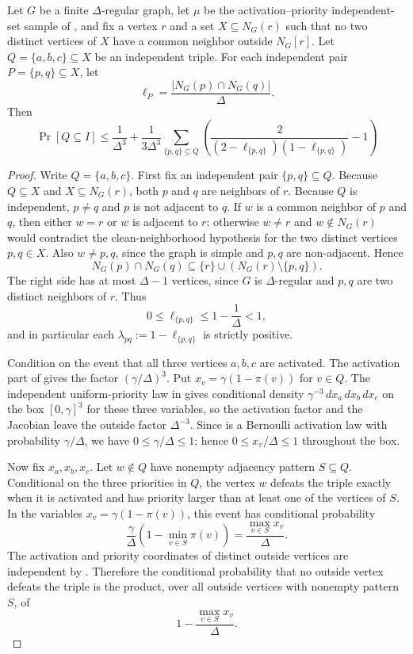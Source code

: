 \begin{helper}
Let $G$ be a finite $\Delta$-regular graph, let $\mu$ be the
activation--priority independent-set sample of
, and fix a vertex $r$ and a set
$X\subseteq N_G(r)$ such that no two distinct vertices of $X$ have a common
neighbor outside $N_G[r]$.  Let $Q=\{a,b,c\}\subseteq X$ be an independent
triple.  For each independent pair $P=\{p,q\}\subseteq X$, let
\[
\ell_P=\frac{|N_G(p)\cap N_G(q)|}{\Delta}.
\]
Then
\[
\Pr[Q\subseteq I]
\le
\frac1{\Delta^3}
+\frac{1}{3\Delta^3}\sum_{\{p,q\}\subseteq Q}
\left(\frac{2}{(2-\ell_{\{p,q\}})(1-\ell_{\{p,q\}})}-1\right)
\]
\end{helper}
\begin{proof}
Write $Q=\{a,b,c\}$.  First fix an independent pair $\{p,q\}\subseteq Q$.
Because $Q\subseteq X$ and $X\subseteq N_G(r)$, both $p$ and $q$ are
neighbors of $r$.  Because $Q$ is independent, $p\ne q$ and $p$ is not
adjacent to $q$.  If $w$ is a common neighbor of $p$ and $q$, then either
$w=r$ or $w$ is adjacent to $r$: otherwise $w\ne r$ and $w\notin N_G(r)$
would contradict the clean-neighborhood hypothesis for the two distinct
vertices $p,q\in X$.  Also $w\ne p,q$, since the graph is simple and
$p,q$ are non-adjacent.  Hence
\[
N_G(p)\cap N_G(q)\subseteq \{r\}\cup (N_G(r)\setminus\{p,q\}).
\]
The right side has at most $\Delta-1$ vertices, since $G$ is
$\Delta$-regular and $p,q$ are two distinct neighbors of $r$.  Thus
\[
0\le \ell_{\{p,q\}}\le 1-\frac1\Delta<1,
\]
and in particular each
$\lambda_{pq}:=1-\ell_{\{p,q\}}$ is strictly positive.

Condition on the event that all three vertices $a,b,c$ are activated.  The
activation part of  gives the factor
$(\gamma/\Delta)^3$.  Put $x_v=\gamma(1-\pi(v))$ for $v\in Q$.  The
independent uniform-priority law in 
gives conditional density $\gamma^{-3}\,dx_a\,dx_b\,dx_c$ on the box
$[0,\gamma]^3$ for these three variables, so the activation factor and the
Jacobian leave the outside factor $\Delta^{-3}$.  Since
 is a Bernoulli activation law with
probability $\gamma/\Delta$, we have $0\le\gamma/\Delta\le1$; hence
$0\le x_v/\Delta\le1$ throughout the box.

Now fix $x_a,x_b,x_c$.  Let $w\notin Q$ have nonempty adjacency pattern
$S\subseteq Q$.  Conditional on the three priorities in $Q$, the vertex $w$
defeats the triple exactly when it is activated and has priority larger than
at least one of the vertices of $S$.  In the variables
$x_v=\gamma(1-\pi(v))$, this event has conditional probability
\[
\frac{\gamma}{\Delta}\left(1-\min_{v\in S}\pi(v)\right)
=\frac{\max_{v\in S}x_v}{\Delta}.
\]
The activation and priority coordinates of distinct outside vertices are
independent by .  Therefore the
conditional probability that no outside vertex defeats the triple is the
product, over all outside vertices with nonempty pattern $S$, of
\[
1-\frac{\max_{v\in S}x_v}{\Delta}.
\]


\end{proof}
